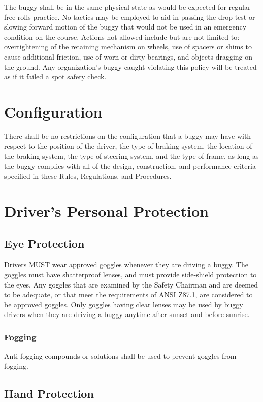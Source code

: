 	The buggy shall be in the same physical state as would be expected for regular
	free rolls practice. No tactics may be employed to aid in passing the drop test
	or slowing forward motion of the buggy that would not be used in an emergency
	condition on the course. Actions not allowed include but are not limited to:
	overtightening of the retaining mechanism on wheels, use of spacers or shims to
	cause additional friction, use of worn or dirty bearings, and objects dragging
	on the ground. Any organization's buggy caught violating this policy will be
	treated as if it failed a spot safety check.


\section{Configuration}

	There shall be no restrictions on the configuration that a buggy may have with
	respect to the position of the driver, the type of braking system, the location
	of the braking system, the type of steering system, and the type of frame, as
	long as the buggy complies with all of the design, construction, and
	performance criteria specified in these Rules, Regulations, and Procedures.

\section{Driver's Personal Protection}

\subsection{Eye Protection}

	Drivers MUST wear approved goggles whenever they are driving a buggy. The
	goggles must have shatterproof lenses, and must provide side-shield protection
	to the eyes. Any goggles that are examined by the Safety Chairman and are
	deemed to be adequate, or that meet the requirements of ANSI Z87.1, are
	considered to be approved goggles. Only goggles having clear lenses may be used
	by buggy drivers when they are driving a buggy anytime after sunset and before
	sunrise.

\subsubsection{Fogging}
	Anti-fogging compounds or solutions shall be used to prevent goggles from fogging.

\subsection{Hand Protection}

